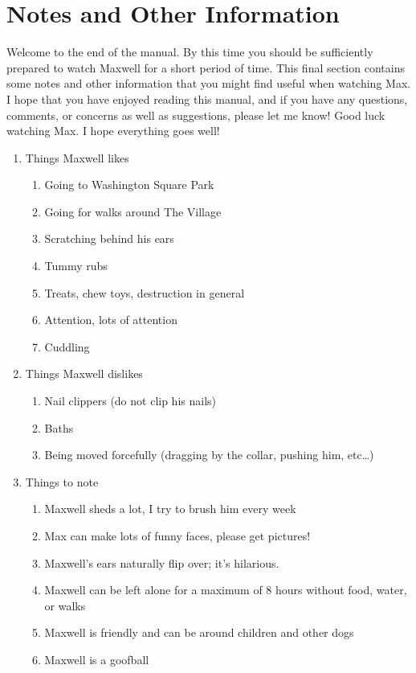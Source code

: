 \documentclass[pdftex,12pt]{article}
\begin{document}
\clearpage
\section{Notes and Other Information}

Welcome to the end of the manual.
By this time you should be sufficiently prepared to watch Maxwell for a short period of time.
This final section contains some notes and other information that you might find useful when watching Max.
I hope that you have enjoyed reading this manual, and if you have any questions, comments, or concerns as well as suggestions, please let me know!
Good luck watching Max.
I hope everything goes well!

\bigskip

\begin{enumerate}\label{itm:other_information}
    \item Things Maxwell likes
        \begin{enumerate}
            \item Going to Washington Square Park
            \item Going for walks around The Village
            \item Scratching behind his ears
            \item Tummy rubs
            \item Treats, chew toys, destruction in general
            \item Attention, lots of attention
            \item Cuddling
        \end{enumerate}
    \item Things Maxwell dislikes
        \begin{enumerate}
            \item Nail clippers (do not clip his nails)
            \item Baths
            \item Being moved forcefully (dragging by the collar, pushing him, etc\ldots)
        \end{enumerate}
    \item Things to note
        \begin{enumerate}
            \item Maxwell sheds a lot, I try to brush him every week
            \item Max can make lots of funny faces, please get pictures!
            \item Maxwell's ears naturally flip over; it's hilarious.
            \item Maxwell can be left alone for a maximum of 8 hours without food, water, or walks
            \item Maxwell is friendly and can be around children and other dogs
            \item Maxwell is a goofball
        \end{enumerate}
\end{enumerate}
\end{document}
